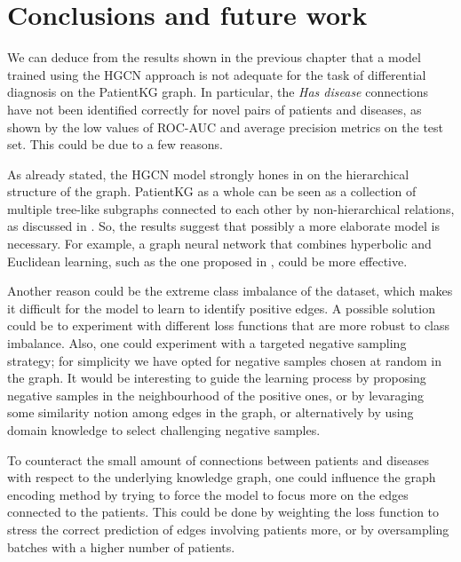 \chapter{Conclusions and future work}
We can deduce from the results shown in the previous chapter that a model trained using the HGCN approach is not adequate for the task of differential diagnosis on the PatientKG graph. In particular, the \emph{Has disease} connections have not been identified correctly for novel pairs of patients and diseases, as shown by the low values of ROC-AUC and average precision metrics on the test set. This could be due to a few reasons. 

As already stated, the HGCN model strongly hones in on the hierarchical structure of the graph. PatientKG as a whole can be seen as a collection of multiple tree-like subgraphs connected to each other by non-hierarchical relations, as discussed in . So, the results suggest that possibly a more elaborate model is necessary. For example, a graph neural network that combines hyperbolic and Euclidean learning, such as the one proposed in \cite{Chami2021representationLearningAlgorithmsHyperbolicSpaces}, could be more effective. 

Another reason could be the extreme class imbalance of the dataset, which makes it difficult for the model to learn to identify positive edges. A possible solution could be to experiment with different loss functions that are more robust to class imbalance. Also, one could experiment with a targeted negative sampling strategy; for simplicity we have opted for negative samples chosen at random in the graph. It would be interesting to guide the learning process by proposing negative samples in the neighbourhood of the positive ones, or by levaraging some similarity notion among edges in the graph, or alternatively by using domain knowledge to select challenging negative samples.

To counteract the small amount of connections between patients and diseases with respect to the underlying knowledge graph, one could influence the graph encoding method by trying to force the model to focus more on the edges connected to the patients. This could be done by weighting the loss function to stress the correct prediction of edges involving patients more, or by oversampling batches with a higher number of patients.